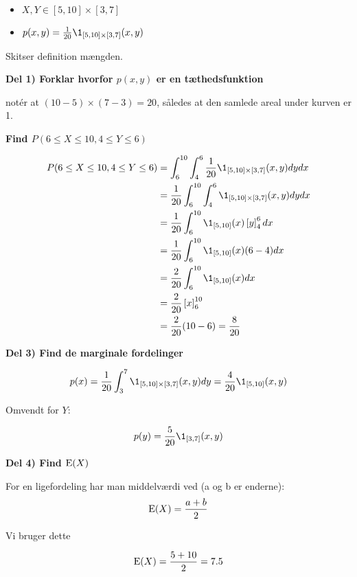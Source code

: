 \begin{itemize}
    \item $X, Y \in [5,10] \times [3,7]$
    \item $p(x,y) = \frac{1}{20}\1_{[5,10] \times [3,7]} (x,y)$
\end{itemize}

Skitser definition mængden.

\textbf{Del 1) Forklar hvorfor $p(x,y)$ er en tæthedsfunktion}

notér at $(10 - 5) \times (7 - 3) = 20$, således at den samlede areal under kurven er 1.

\textbf{Find $P(6 \leq X \leq 10, 4 \leq Y \leq 6)$}

\begin{align}
    P(6 \leq X \leq 10, 4 \leq Y \leq 6) &= \int_{6}^{10}\int_{4}^{6} \frac{1}{20}\1_{[5,10] \times [3,7]} (x,y) dy dx \\
    &= \frac{1}{20} \int_{6}^{10}\int_{4}^{6} \1_{[5,10] \times [3,7]} (x,y) dy dx \\
    &= \frac{1}{20} \int_{6}^{10} \1_{[5,10]}(x) \lsp y \rsp_4^6 dx \\
    &= \frac{1}{20} \int_{6}^{10} \1_{[5,10]}(x) (6 - 4) dx \\
    &= \frac{2}{20}\int_{6}^{10} \1_{[5,10]}(x) dx \\
    &= \frac{2}{20} \lsp x \rsp_{6}^{10} \\ 
    &=  \frac{2}{20} (10-6) = \frac{8}{20}
\end{align}

\textbf{Del 3) Find de marginale fordelinger}

\begin{equation}
    p(x) = \frac{1}{20}\int_{3}^{7} \1_{[5,10] \times [3, 7]} (x,y) dy = \frac{4}{20} \1_{[5,10]} (x,y) 
\end{equation}

Omvendt for $Y$:

\begin{equation}
    p(y) = \frac{5}{20} \1_{[3,7]} (x,y)
\end{equation}

\textbf{Del 4) Find $\text{E}(X)$}

For en ligefordeling har man middelværdi ved (a og b er enderne):
\begin{equation}
    \text{E}(X) = \frac{a + b}{2}
\end{equation}

Vi bruger dette

\begin{equation}
    \text{E}(X) = \frac{5 + 10}{2} =7.5
\end{equation}

